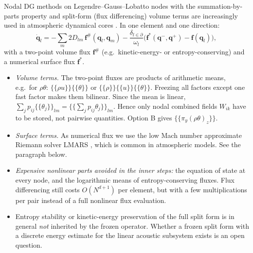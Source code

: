 \documentclass[11pt,a4paper]{article}
\theoremstyle{definition}
\theoremstyle{remark}
\begin{document}
Nodal DG methods on Legendre--Gauss--Lobatto nodes with the
summation-by-parts property and split-form (flux differencing) volume
terms \cite{GassnerWintersKopriva2016} are increasingly used in
atmospheric dynamical cores \cite{GiraldoKellyConstantinescu2013}. In
one element and one direction:
\begin{equation*}
 \dot{\mathbf q}_l=-\sum_m2D_{lm}\,\mathbf f^\#(\mathbf q_l,\mathbf q_m)
 -\frac{\delta_{l\in\partial}}{\omega_l}\big(\mathbf f^*(\mathbf q^-,\mathbf q^+)-\mathbf f(\mathbf q_l)\big),
\end{equation*}
with a two-point volume flux $\mathbf f^\#$ (e.g.\ kinetic-energy- or
entropy-conserving) and a numerical surface flux $\mathbf f^*$.
\begin{itemize}
\item \emph{Volume terms.} The two-point fluxes are products of
  arithmetic means, e.g.\ for $\rho\theta$:
  $\{\!\{\rho u\}\!\}\{\!\{\theta\}\!\}$ or
  $\{\!\{\rho\}\!\}\{\!\{u\}\!\}\{\!\{\theta\}\!\}$. Freezing all factors
  except one fast factor makes them bilinear. Since the mean is linear,
  $\sum_jp_{ij}\{\!\{\theta_j\}\!\}_{lm}=\{\!\{\sum_jp_{ij}\theta_j\}\!\}_{lm}$.
  Hence only nodal combined fields $W_{ik}$ have to be stored, not
  pairwise quantities. Option B gives $\{\!\{\pi_y(\rho\theta)_z\}\!\}$.
\item \emph{Surface terms.} As numerical flux we use the low Mach
  number approximate Riemann solver LMARS \cite{Chen2013}, which is
  common in atmospheric models. See the paragraph below.
\item \emph{Expensive nonlinear parts avoided in the inner steps:} the
  equation of state at every node, and the logarithmic means of
  entropy-conserving fluxes. Flux differencing still costs
  $O(N^{d+1})$ per element, but with a few multiplications per pair
  instead of a full nonlinear flux evaluation.
\item Entropy stability or kinetic-energy preservation of the full split
  form is in general \emph{not} inherited by the frozen operator. Whether
  a frozen split form with a discrete energy estimate for the linear
  acoustic subsystem exists is an open question.
\end{itemize}
\end{document}
